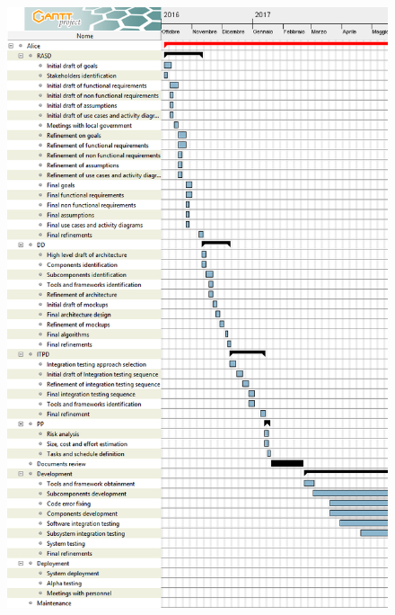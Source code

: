 \begin{figure}[H]
	\centering
	\includegraphics[height=\textheight, keepaspectratio]{resource_allocation/diagrams/ScheduleAlice1.png}
\end{figure}

